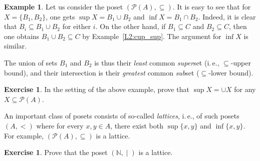 \documentclass[12pt,notitlepage]{article}
\theoremstyle{plain}
\theoremstyle{definition}
\newtheorem{exc}[thm]{Exercise}
\newtheorem{exm}[thm]{Example}
\theoremstyle{plain}
\newcommand{\N}{\mathbb{N}}
\newcommand{\sbs}{\subseteq}
\newcommand{\void}{\varnothing}
\newcommand{\mP}{\mathcal{P}}
\newcommand{\1}{\mathbf{1}}
\newcommand{\0}{\mathbf{0}}
\newcommand{\dvd}{\mathop{\mid}}
\begin{document}
\begin{exm}
%

Let us consider the poset $(\mP(A), {\sbs})$. It is easy to see that for $X = \{B_1, B_2\}$, one gets $\sup X = B_1 \cup B_2$ and $\inf X = B_1  \cap B_2$.
Indeed, it is clear that $B_i \sbs B_1 \cup B_2$ for either $i$. On the other hand, if $B_1 \sbs C$ and $B_2 \sbs C$, then one obtains $B_1 \cup B_2 \sbs C$ by Example~\ref{L2:cup_sup}. The argument for $\inf X$ is similar.

The union of sets $B_1$ and $B_2$ is thus their \emph{least} common \emph{super}set (i.\,e., ${\sbs}$-upper bound), and their intersection is their \emph{greatest} common \emph{sub}set (${\sbs}$-lower bound).
\end{exm}

\begin{exc}
In the setting of the above example, prove that $\sup X = \cup X$ for any $X \sbs \mP(A)$.
\end{exc}

An important class of posets consists of so-called \emph{lattices}, i.\,e., of such posets $(A,{<})$ where for every $x, y \in A$, there exist both $\sup \{x, y\}$ and $\inf \{x, y\}$. For example, $(\mP(A), {\sbs})$ is a lattice.

\begin{exc}
Prove that the poset $(\N,{\dvd})$ is a lattice.
\end{exc}
%
%
\end{document}
